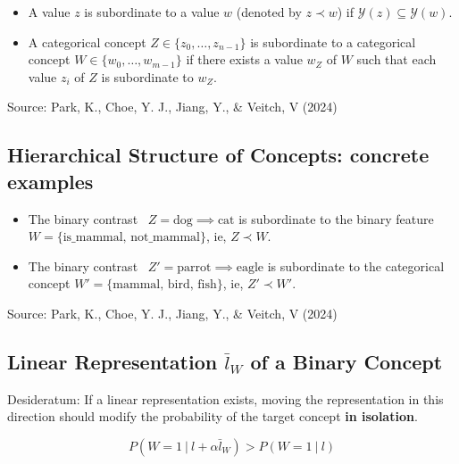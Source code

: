 \documentclass[
  letterpaper,
  DIV=11,
  numbers=noendperiod]{scrartcl}
\providecommand{\tightlist}{%
  \setlength{\itemsep}{0pt}\setlength{\parskip}{0pt}}\usepackage{longtable,booktabs,array}
\begin{document}
\begin{itemize}
\tightlist
\item
  A value \(z\) is subordinate to a value \(w\) (denoted by
  \(z \prec w\)) if \(\mathcal{Y}(z) \subseteq \mathcal{Y}(w)\).
\end{itemize}

\begin{itemize}
\tightlist
\item
  A categorical concept \(Z \in \{z_0, \ldots, z_{n-1}\}\) is
  subordinate to a categorical concept
  \(W \in \{w_0, \ldots, w_{m-1}\}\) if there exists a value \(w_Z\) of
  \(W\) such that each value \(z_i\) of \(Z\) is subordinate to \(w_Z\).
\end{itemize}

Source: Park, K., Choe, Y. J., Jiang, Y., \& Veitch, V (2024)

\subsection{Hierarchical Structure of Concepts: concrete
examples}\label{hierarchical-structure-of-concepts-concrete-examples}

\begin{itemize}
\tightlist
\item
  The binary contrast ~\(Z = \text{dog} \implies \text{cat}\) is
  subordinate to the binary feature
  \(W = \{\text{is_mammal, not_mammal}\}\), ie, \(Z \prec W\).
\item
  The binary contrast ~\(Z' = \text{parrot} \implies \text{eagle}\) is
  subordinate to the categorical concept
  \(W' = \{\text{mammal, bird, fish}\}\), ie, \(Z' \prec W'\).
\end{itemize}

Source: Park, K., Choe, Y. J., Jiang, Y., \& Veitch, V (2024)

\subsection{\texorpdfstring{Linear Representation \(\bar{l}_W\) of a
Binary
Concept}{Linear Representation \textbackslash bar\{l\}\_W of a Binary Concept}}\label{linear-representation-barl_w-of-a-binary-concept}

Desideratum: If a linear representation exists, moving the
representation in this direction should modify the probability of the
target concept \textbf{in isolation}.

\[P(W = 1\ |\ l + \alpha \bar{l}_W) > P (W = 1\ |\ l)\]
\end{document}
